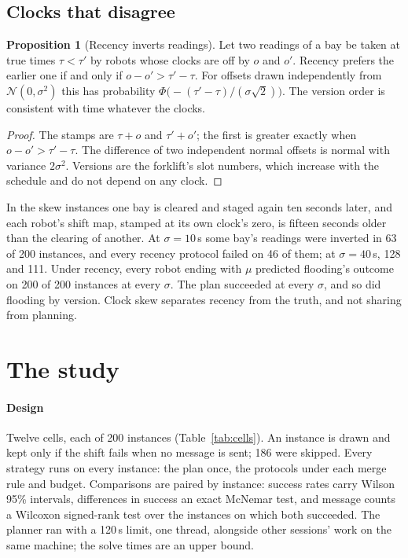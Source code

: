 \documentclass[11pt,a4paper]{article}
\theoremstyle{definition}
\newtheorem{proposition}{Proposition}
\newcommand{\merged}{\mu}
\begin{document}
\subsection{Clocks that disagree}

\begin{proposition}[Recency inverts readings]
\label{prop:skew}
Let two readings of a bay be taken at true times $\tau < \tau'$ by robots whose
clocks are off by $o$ and $o'$. Recency prefers the earlier one if and only if
$o - o' > \tau' - \tau$. For offsets drawn independently from
$\mathcal{N}(0, \sigma^2)$ this has probability
$\Phi\bigl(-(\tau' - \tau)/(\sigma\sqrt{2})\bigr)$. The version order is consistent
with time whatever the clocks.
\end{proposition}

\begin{proof}
The stamps are $\tau + o$ and $\tau' + o'$; the first is greater exactly when
$o - o' > \tau' - \tau$. The difference of two independent normal offsets is normal
with variance $2\sigma^2$. Versions are the forklift's slot numbers, which increase
with the schedule and do not depend on any clock.
\end{proof}

In the skew instances one bay is cleared and staged again ten seconds later, and
each robot's shift map, stamped at its own clock's zero, is fifteen seconds older
than the clearing of another. At $\sigma = 10$\,s some bay's readings were inverted
in 63 of 200 instances, and every recency protocol failed on 46 of them; at
$\sigma = 40$\,s, 128 and 111. Under recency, every robot ending with
$\merged$ predicted flooding's outcome on 200 of 200 instances at every $\sigma$.
The plan succeeded at every $\sigma$, and so did flooding by version. Clock skew
separates recency from the truth, and not sharing from planning.

\section{The study}
\label{sec:study}

\paragraph{Design} Twelve cells, each of 200 instances (Table~\ref{tab:cells}). An
instance is drawn and kept only if the shift fails when no message is sent; 186
were skipped. Every strategy runs on every instance: the plan once, the protocols
under each merge rule and budget. Comparisons are paired by instance: success rates
carry Wilson 95\% intervals, differences in success an exact McNemar test, and
message counts a Wilcoxon signed-rank test over the instances on which both
succeeded. The planner ran with a 120\,s limit, one thread, alongside other
sessions' work on the same machine; the solve times are an upper bound.
\end{document}

